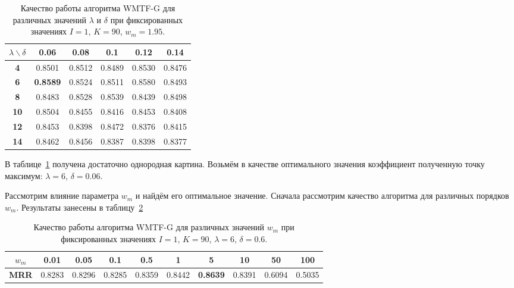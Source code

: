     \begin{table}[ht!]
        \caption{Качество работы алгоритма WMTF-G для различных значений $\lambda$ и $\delta$ при фиксированных значениях $I=1$, $K=90$, $w_m=1.95$. \bigskip}
        \centering

        \label{tabular:wtmfg_test2}
        \begin{tabular}{|c|c|c|c|c|c|} \hline
            $\lambda \backslash \delta$ & \bf{0.06} & \bf{0.08} & \bf{0.1} & \bf{0.12} & \bf{0.14}  \\ \hline
            \bf{4}  & 0.8501 & 0.8512 & 0.8489 & 0.8530 & 0.8476  \\ \hline
            \bf{6}  & \bf{0.8589} & 0.8524 & 0.8511 & 0.8580 & 0.8493  \\ \hline
            \bf{8}  & 0.8483 & 0.8528 & 0.8539 & 0.8439 & 0.8498  \\ \hline
            \bf{10} & 0.8504 & 0.8455 & 0.8416 & 0.8453 & 0.8408  \\ \hline
            \bf{12} & 0.8453 & 0.8398 & 0.8472 & 0.8376 & 0.8415  \\ \hline
            \bf{14} & 0.8462 & 0.8456 & 0.8387 & 0.8398 & 0.8377  \\ \hline
        \end{tabular}
    \end{table}

    В таблице~\ref{tabular:wtmfg_test2} получена достаточно однородная картина. Возьмём в качестве оптимального значения коэффициент полученную точку максимум: $\lambda=6$, $\delta=0.06$.

    Рассмотрим влияние параметра $w_m$ и найдём его оптимальное значение. Сначала рассмотрим качество алгоритма для различных порядков $w_m$.
    Результаты занесены в таблицу~\ref{tabular:wtmfg_test3}

    \begin{table}[ht!]
        \caption{Качество работы алгоритма WMTF-G для различных значений $w_m$ при фиксированных значениях $I=1$, $K=90$, $\lambda=6$, $\delta=0.6$. \bigskip}
        \centering

        \label{tabular:wtmfg_test3}
        \begin{tabular}{|c|c|c|c|c|c|c|c|c|c|} \hline
            $w_m$ & 0.01 & 0.05 & 0.1 & 0.5 & 1 & 5 & 10 & 50 & 100 \\ \hline
            \bf{MRR} & 0.8283 & 0.8296 & 0.8285 & 0.8359 & 0.8442 & \bf{0.8639} & 0.8391 & 0.6094 & 0.5035 \\ \hline

        \end{tabular}
    \end{table}

